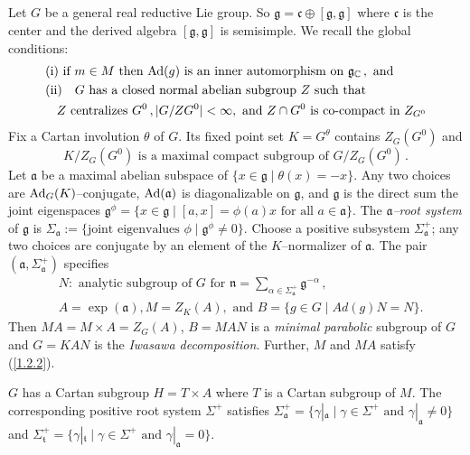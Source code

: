 \documentclass{conm-p-l}
\renewcommand{\gg}{\mathfrak{g}}
\def\ga{\mathfrak{a}}
\def\gc{\mathfrak{c}}
\def\gg{\mathfrak{g}}
\def\gn{\mathfrak{n}}
\def\gt{\mathfrak{t}}
\def\Ad{{\rm Ad}}
\def\C{\mathbb{C}}
\begin{document}
\subsection{}\label{ssec1b} 
\setcounter{equation}{0}
Let $G$ be a general real reductive Lie group.  So
$\gg = \gc \oplus [\gg,\gg]$ where $\gc$ is the center and the derived
algebra $[\gg,\gg]$ is semisimple.  We recall the global conditions:
\begin{equation}\label{1.2.2}
\begin{aligned}
&{\rm (i) }\text{ if } m \in M \text{ then } \Ad(g) 
	\text{ is an inner automorphism on } \gg_\C\,, \text{ and }\\
&{\rm (ii)}\quad G \text{ has a closed normal abelian subgroup } Z \text{ such that}\\
&\phantom{X} Z \text{ centralizes } G^0\,, |G/ZG^0| < \infty, \text{ and }
	Z\cap G^0 \text{ is co-compact in } Z_{G^0}
\end{aligned}
\end{equation}
Fix a Cartan involution $\theta$ of $G$.  Its fixed point set $K = G^\theta$
contains $Z_G(G^0)$ and
\begin{equation}\label{1.3.2}
K/Z_G(G^0) \text{ is a maximal compact subgroup of } G/Z_G(G^0)\,.
\end{equation}
Let $\ga$ be a maximal abelian subspace of $\{x \in \gg\mid \theta(x) = -x\}$.
Any two choices are $\Ad_G(K)$--conjugate, $\Ad(\ga)$ is diagonalizable on
$\gg$, and $\gg$ is the direct sum
the joint eigenspaces $\gg^\phi = \{x \in \gg \mid [a,x] = \phi(a)x
\text{ for all } a \in \ga\}$.   The {\em $\ga$--root system} of $\gg$ is
$\Sigma_\ga := \{\text{joint eigenvalues } \phi \mid \gg^\phi \ne 0\}$.
Choose a positive subsystem $\Sigma_\ga^+$; any two choices are conjugate
by an element of the $K$--normalizer of $\ga$.  The pair $(\ga,\Sigma_\ga^+)$
specifies
\begin{equation}\label{1.2.5}
\begin{aligned}
&N: \text{ analytic subgroup of $G$ for } \gn = 
	{\sum}_{\alpha \in \Sigma_\ga^+} \gg^{-\alpha}\,, \\
&A = \exp(\ga), M = Z_K(A), \text{ and }B = \{g \in G \mid Ad(g)N = N\}.
\end{aligned}
\end{equation}
Then $MA = M\times A = Z_G(A)$, $B = MAN$ is a {\em minimal parabolic} 
subgroup of $G$ and $G = KAN$ is the {\em Iwasawa decomposition}.  Further, 
$M$ and $MA$ satisfy (\ref{1.2.2}).

$G$ has a Cartan subgroup $H = T \times A$ where $T$ is a Cartan subgroup of
$M$.  The corresponding positive root system $\Sigma^+$ satisfies 
$\Sigma_\ga^+ = \{\gamma|_\ga \mid \gamma \in \Sigma^+
\text{ and } \gamma|_\ga \ne 0\}$ and $\Sigma_\gt^+ =
\{\gamma|_\gt \mid \gamma \in \Sigma^+ \text{ and } \gamma|_\ga = 0\}$.
\end{document}
